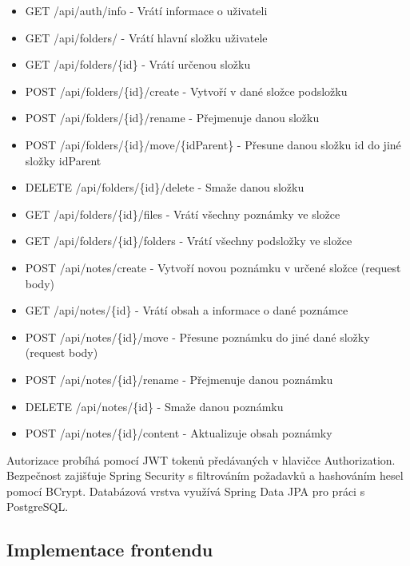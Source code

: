 \begin{itemize}
    \item {\color{blue} GET} /api/auth/info - Vrátí informace o uživateli
    \item {\color{blue} GET} /api/folders/ - Vrátí hlavní složku uživatele
    \item {\color{blue} GET} /api/folders/\{id\} - Vrátí určenou složku
    \item {\color{green} POST} /api/folders/\{id\}/create - Vytvoří v dané složce podsložku
    \item {\color{green} POST} /api/folders/\{id\}/rename - Přejmenuje danou složku
    \item {\color{green} POST} /api/folders/\{id\}/move/\{idParent\} - Přesune danou složku id do jiné
          složky idParent
    \item {\color{red} DELETE} /api/folders/\{id\}/delete - Smaže danou složku
    \item {\color{blue} GET} /api/folders/\{id\}/files - Vrátí všechny poznámky ve složce
    \item {\color{blue} GET} /api/folders/\{id\}/folders - Vrátí všechny podsložky ve složce
    \item {\color{green} POST} /api/notes/create - Vytvoří novou poznámku v určené složce (request body)
    \item {\color{blue} GET} /api/notes/\{id\} - Vrátí obsah a informace o dané poznámce
    \item {\color{green} POST} /api/notes/\{id\}/move - Přesune poznámku do jiné dané složky (request
          body)
    \item {\color{green} POST} /api/notes/\{id\}/rename - Přejmenuje danou poznámku
    \item {\color{red} DELETE} /api/notes/\{id\} - Smaže danou poznámku
    \item {\color{green} POST} /api/notes/\{id\}/content - Aktualizuje obsah poznámky
\end{itemize}

Autorizace probíhá pomocí JWT tokenů předávaných v hlavičce Authorization.
Bezpečnost zajišťuje Spring Security s filtrováním požadavků a hashováním hesel
pomocí BCrypt. Databázová vrstva využívá Spring Data JPA pro práci s
PostgreSQL.

\subsection{Implementace frontendu}

